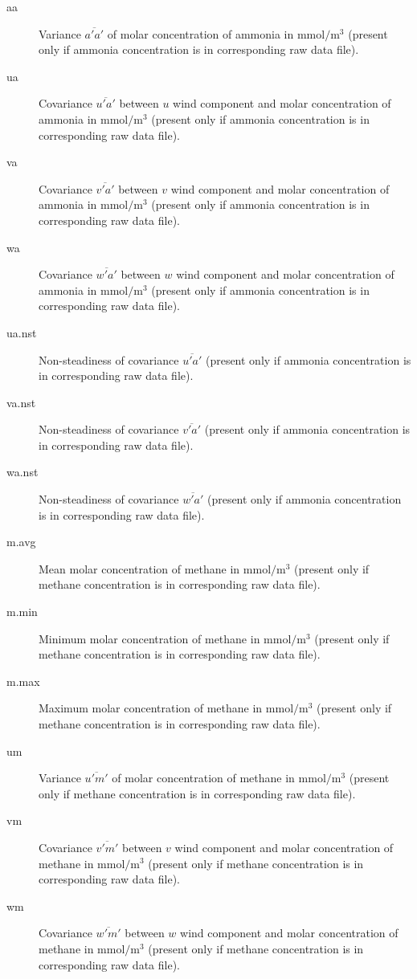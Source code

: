 \documentclass[a4paper,10pt]{book}
\begin{document}
\begin{description}
 \item[aa] Variance $\overline{a'a'}$ of molar concentration of ammonia in $\mbox{mmol}/\mbox{m}^{3}$ (present only if ammonia concentration is in corresponding raw data file).
 \item[ua] Covariance $\overline{u'a'}$ between $u$ wind component and molar concentration of ammonia in $\mbox{mmol}/\mbox{m}^{3}$ (present only if ammonia concentration is in corresponding raw data file).
 \item[va] Covariance $\overline{v'a'}$ between $v$ wind component and molar concentration of ammonia in $\mbox{mmol}/\mbox{m}^{3}$ (present only if ammonia concentration is in corresponding raw data file).
 \item[wa] Covariance $\overline{w'a'}$ between $w$ wind component and molar concentration of ammonia in $\mbox{mmol}/\mbox{m}^{3}$ (present only if ammonia concentration is in corresponding raw data file).
 \item[ua.nst] Non-steadiness of covariance $\overline{u'a'}$ (present only if ammonia concentration is in corresponding raw data file).
 \item[va.nst] Non-steadiness of covariance $\overline{v'a'}$ (present only if ammonia concentration is in corresponding raw data file).
 \item[wa.nst] Non-steadiness of covariance $\overline{w'a'}$ (present only if ammonia concentration is in corresponding raw data file).
 \item[m.avg] Mean molar concentration of methane in $\mbox{mmol}/\mbox{m}^{3}$ (present only if methane concentration is in corresponding raw data file).
 \item[m.min] Minimum molar concentration of methane in $\mbox{mmol}/\mbox{m}^{3}$ (present only if methane concentration is in corresponding raw data file).
 \item[m.max] Maximum molar concentration of methane in $\mbox{mmol}/\mbox{m}^{3}$ (present only if methane concentration is in corresponding raw data file).
 \item[um] Variance $\overline{u'm'}$ of molar concentration of methane in $\mbox{mmol}/\mbox{m}^{3}$ (present only if methane concentration is in corresponding raw data file).
 \item[vm] Covariance $\overline{v'm'}$ between $v$ wind component and molar concentration of methane in $\mbox{mmol}/\mbox{m}^{3}$ (present only if methane concentration is in corresponding raw data file).
 \item[wm] Covariance $\overline{w'm'}$ between $w$ wind component and molar concentration of methane in $\mbox{mmol}/\mbox{m}^{3}$ (present only if methane concentration is in corresponding raw data file).

\end{description}
\end{document}
